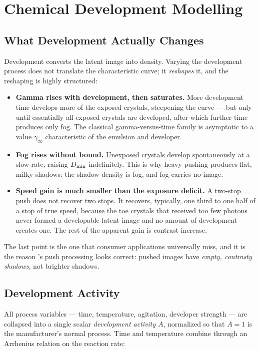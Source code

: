 \section{Chemical Development Modelling}
\label{sec:development}

\subsection{What Development Actually Changes}

Development converts the latent image into density. Varying the development
process does not translate the characteristic curve; it \emph{reshapes} it, and
the reshaping is highly structured:

\begin{itemize}
\item \textbf{Gamma rises with development, then saturates.} More development
time develops more of the exposed crystals, steepening the curve --- but only
until essentially all exposed crystals are developed, after which further time
produces only fog. The classical gamma-versus-time family
\cite{james1977,kodakh740} is asymptotic to a
value $\gamma_\infty$ characteristic of the emulsion and developer.
\item \textbf{Fog rises without bound.} Unexposed crystals develop
spontaneously at a slow rate, raising $D_{\min}$ indefinitely. This is why heavy
pushing produces flat, milky shadows: the shadow density is fog, and fog
carries no image.
\item \textbf{Speed gain is much smaller than the exposure deficit.} A
two-stop push does not recover two stops. It recovers, typically, one third to
one half of a stop of true speed, because the toe crystals that received too
few photons never formed a developable latent image and no amount of
development creates one. The rest of the apparent gain is contrast increase.
\end{itemize}

The last point is the one that consumer applications universally miss, and it
is the reason \EM{}'s push processing looks correct: pushed images have
\emph{empty, contrasty shadows}, not brighter shadows.

\subsection{Development Activity}

All process variables --- time, temperature, agitation, developer strength ---
are collapsed into a single scalar \emph{development activity} $A$, normalized
so that $A = 1$ is the manufacturer's normal process. Time and temperature
combine through an Arrhenius relation on the reaction rate:

